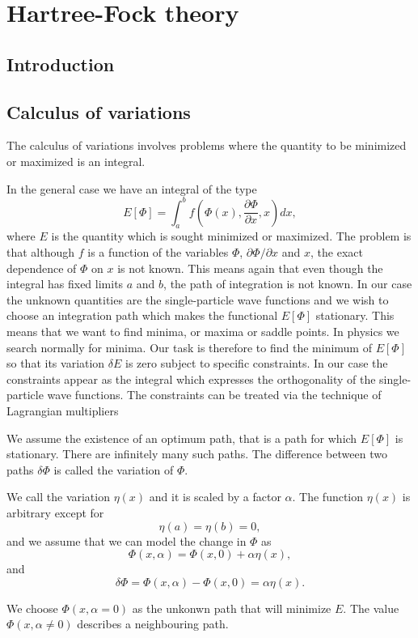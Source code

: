 
\chapter{Hartree-Fock theory}

\section{Introduction}

\section{Calculus of variations}


The calculus of variations involves 
problems where the quantity to be minimized or maximized is an integral. 

In the general case we have an integral of the type
\[ E[\Phi]= \int_a^b f(\Phi(x),\frac{\partial \Phi}{\partial x},x)dx,\]
where $E$ is the quantity which is sought minimized or maximized.
The problem is that although $f$ is a function of the variables $\Phi$, $\partial \Phi/\partial x$ and $x$, the exact dependence of
$\Phi$ on $x$ is not known.  This means again that even though the integral has fixed limits $a$ and $b$, the path of integration is
not known. In our case the unknown quantities are the single-particle wave functions and we wish to choose an integration path which makes
the functional $E[\Phi]$ stationary. This means that we want to find minima, or maxima or saddle points. In physics we search normally for minima.
Our task is therefore to find the minimum of $E[\Phi]$ so that its variation $\delta E$ is zero  subject to specific
constraints. In our case the constraints appear as the integral which expresses the orthogonality of the  single-particle wave functions.
The constraints can be treated via the technique of Lagrangian multipliers

We assume the existence of an optimum path, that is a path for which $E[\Phi]$ is stationary. There are infinitely many such paths.
The difference between two paths $\delta\Phi$ is called the variation of $\Phi$.

We call the variation $\eta(x)$  and it is scaled by a factor $\alpha$.  The function $\eta(x)$ is arbitrary except
for 
\[ 
\eta(a)=\eta(b)=0,
\]
and we assume that we can model the change in $\Phi$ as 
\[
\Phi(x,\alpha) = \Phi(x,0)+\alpha\eta(x),
\]
and 
\[
\delta\Phi = \Phi(x,\alpha) -\Phi(x,0)=\alpha\eta(x).
\]

We choose $\Phi(x,\alpha=0)$ as the unkonwn path  that will minimize $E$.  The value 
$\Phi(x,\alpha\ne 0)$  describes a neighbouring path. 
 
